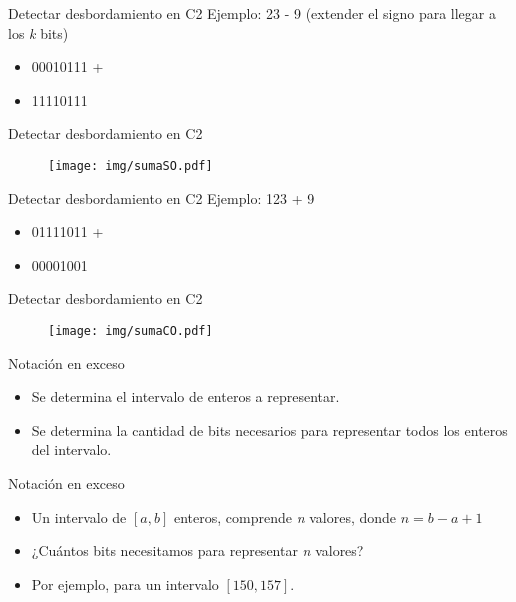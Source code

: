 \documentclass[11pt,a4paper,spanish]{beamer}
\begin{document}
\begin{frame}{Detectar desbordamiento en C2}
    Ejemplo: 23 - 9 (extender el signo para llegar a los \textit{k} bits)
    \begin{itemize}
        \item 00010111 +
        \item 11110111
    \end{itemize}
\end{frame}

\begin{frame}{Detectar desbordamiento en C2}
    \begin{figure}
    \centering
    \texttt{[image: img/sumaSO.pdf]}
    \captionsetup{labelformat=empty}
    \caption{}
    \end{figure}
\end{frame}

\begin{frame}{Detectar desbordamiento en C2}
    Ejemplo: 123 + 9
    \begin{itemize}
        \item 01111011 +
        \item 00001001
    \end{itemize}
\end{frame}

\begin{frame}{Detectar desbordamiento en C2}
    \begin{figure}
        \centering
        \texttt{[image: img/sumaCO.pdf]}
        \captionsetup{labelformat=empty}
        \caption{}
    \end{figure}
\end{frame}

\begin{frame}{Notación en exceso}

    \begin{itemize}
    \item Se determina el intervalo de enteros a representar.
    \item Se determina la cantidad de bits necesarios para representar todos los enteros del intervalo.
    \end{itemize}
\end{frame}

\begin{frame}{Notación en exceso}
    \begin{itemize}
        \item Un intervalo de $[a,b]$ enteros, comprende \textit{n} valores, donde $n = b - a + 1$
        \item ¿Cuántos bits necesitamos para representar \textit{n} valores?
        \item Por ejemplo, para un intervalo $[150,157]$.
    \end{itemize}
\end{frame}
\end{document}
